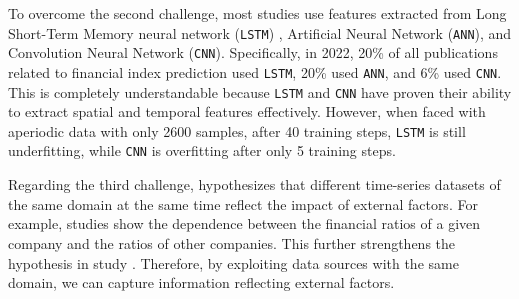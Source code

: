\documentclass[aps,prb,groupedaddress,twocolumn,showpacs,dvipdfmx,superscriptaddress,pdftex]{revtex4-2}
\begin{document}
To overcome the second challenge, most studies use features extracted from Long Short-Term Memory neural network (\verb|LSTM|) \cite{hochreiter1997long}, Artificial Neural Network (\verb|ANN|), and Convolution Neural Network (\verb|CNN|)\cite{lecun1989handwritten}. Specifically, in 2022, 20\% of all publications related to financial index prediction used \verb|LSTM|, 20\% used \verb|ANN|, and 6\% used \verb|CNN|\cite{ayitey2023forex}. This is completely understandable because \verb|LSTM| and \verb|CNN| have proven their ability to extract spatial and temporal features effectively. However, when faced with aperiodic data with only 2600 samples, after 40 training steps, \verb|LSTM| is still underfitting, while \verb|CNN| is overfitting after only 5 training steps.

\vspace{2mm}


Regarding the third challenge, \cite{fama1970efficient} hypothesizes that different time-series datasets of the same domain at the same time reflect the impact of external factors. For example, studies \citep{overreactioncontrarian, mech1993portfolio} show the dependence between the financial ratios of a given company and the ratios of other companies. This further strengthens the hypothesis in study \cite{fama1970efficient}. Therefore, by exploiting data sources with the same domain, we can capture information reflecting external factors.

\vspace{2mm}

\end{document}

